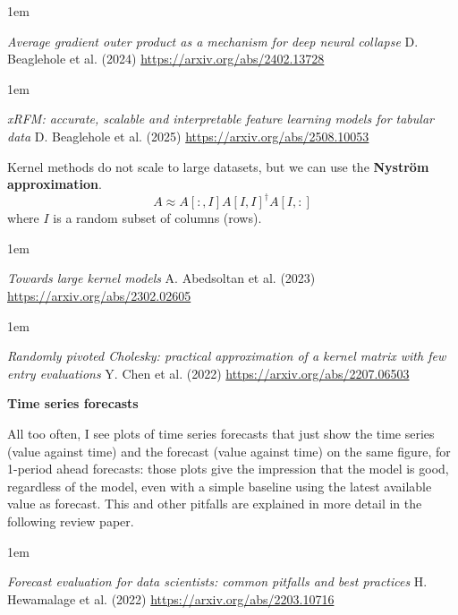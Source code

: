 \documentclass[a5paper]{article}
\let\d\textbf
\newenvironment{reference}{%
  \medskip\goodbreak
  \parskip 0pt
  \raggedright
  \leftskip 1em
  \obeylines
}{\par\medskip\goodbreak}
\def\section#1{\clearpage{\vspace*{0cm}\LARGE\centering\bfseries #1\par\bigskip\bigskip}}
\def\subsection#1{{\par\bigskip\goodbreak\large\bfseries #1\par}}
\begin{document}
\begin{reference}
  \emph{Average gradient outer product  as a mechanism for deep neural collapse}
  D. Beaglehole et al. (2024)
  \url{https://arxiv.org/abs/2402.13728}
\end{reference}

\begin{reference}
  \emph{xRFM: accurate, scalable and interpretable feature learning models for tabular data}
  D. Beaglehole et al. (2025)
  \url{https://arxiv.org/abs/2508.10053}
\end{reference}

Kernel methods do not scale to large datasets, but we can use the \d{Nyström approximation}.
\[ A \approx A[:,I] A[I,I]^\dagger A[I,:] \]
where $I$ is a random subset of columns (rows).

\begin{reference}
  \emph{Towards large kernel models}
  A. Abedsoltan et al. (2023)
  \url{https://arxiv.org/abs/2302.02605}
\end{reference}

\begin{reference}
  \emph{Randomly pivoted Cholesky:  practical approximation of a kernel matrix  with few entry evaluations}
  Y. Chen et al. (2022)
  \url{https://arxiv.org/abs/2207.06503}
\end{reference}

\section{Time series}

\subsection{Time series forecasts}

All too often, I see plots of time series forecasts
that just show the time series (value against time)
and the forecast (value against time) on the same figure,
for 1-period ahead forecasts:
those plots give the impression that the model is good, regardless of the model,
even with a simple baseline using the latest available value as forecast.
This and other pitfalls are explained in more detail in the following review paper.

\begin{reference}
  \emph{Forecast evaluation for data scientists: common pitfalls and best practices}
  H. Hewamalage et al. (2022)
  \url{https://arxiv.org/abs/2203.10716}
\end{reference}
\end{document}
